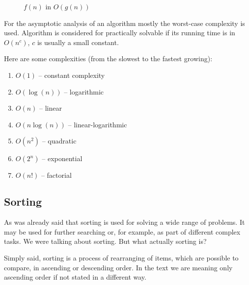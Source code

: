 \documentclass[
  field=inf,
  biblatex,
  language=english,
  glossaries,
  theorems=false,
  sourcecodes=false,
  index
]{kidiplom}
\begin{document}
\begin{figure}[H]
	\begin{center}
		\caption{$f(n)$ in $O(g(n))$} \label{fig:big-omega}
	\end{center}
\end{figure}

For the asymptotic analysis of an algorithm mostly the worst-case complexity is used. Algorithm is considered for practically solvable if its running time is in $O(n^c)$, $c$ is usually a small constant. 

Here are some complexities (from the slowest to the fastest growing):
\begin{enumerate}
 \item $O(1)$ -- constant complexity
 \item $O(\log(n))$ -- logarithmic
 \item $O(n)$ -- linear
 \item $O(n \log(n))$ -- linear-logarithmic
 \item $O(n^2)$ -- quadratic
 \item $O(2^n)$ -- exponential
 \item $O(n!)$ -- factorial
\end{enumerate}

\subsection{Sorting}

As was already said that sorting is used for solving a wide range of problems. It may be used for further searching or, for example, as part of different complex tasks. We were talking about sorting. But what actually sorting is?

Simply said, sorting is a process of rearranging of items, which are possible to compare, in ascending or descending order. In the text we are meaning only ascending order if not stated in a different way.
\end{document}
